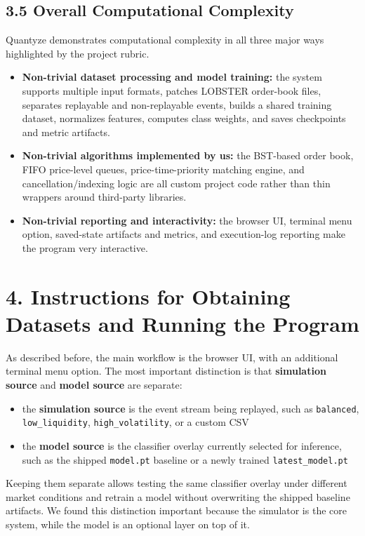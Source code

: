 \documentclass[11pt]{article}
\begin{document}
\subsection*{3.5 Overall Computational Complexity}
Quantyze demonstrates computational complexity in all three major ways
highlighted by the project rubric.

\begin{itemize}
    \item \textbf{Non-trivial dataset processing and model training:} the system
    supports multiple input formats, patches LOBSTER order-book files,
    separates replayable and non-replayable events, builds a shared
    training dataset, normalizes features, computes class weights, and saves
    checkpoints and metric artifacts.
    \item \textbf{Non-trivial algorithms implemented by us:} the BST-based order
    book, FIFO price-level queues, price-time-priority matching engine, and
    cancellation/indexing logic are all custom project code rather than thin
    wrappers around third-party libraries.
    \item \textbf{Non-trivial reporting and interactivity:} the browser UI,
    terminal menu option, saved-state artifacts and metrics, and
    execution-log reporting make the program very interactive.
\end{itemize}

\section*{4. Instructions for Obtaining Datasets and Running the Program}
As described before, the main workflow is the browser UI, with an additional terminal menu option. The most important
distinction is that \textbf{simulation source} and \textbf{model source} are
separate:
\begin{itemize}
    \item the \textbf{simulation source} is the event stream being replayed,
    such as \texttt{balanced}, \texttt{low\_liquidity},
    \texttt{high\_volatility}, or a custom CSV
    \item the \textbf{model source} is the classifier overlay currently
    selected for inference, such as the shipped \texttt{model.pt} baseline or
    a newly trained \texttt{latest\_model.pt}
\end{itemize}

Keeping them separate allows testing the same classifier overlay under
different market conditions and retrain a model without overwriting the shipped
baseline artifacts. We found this distinction important because the simulator
is the core system, while the model is an optional layer on top of it.
\end{document}
